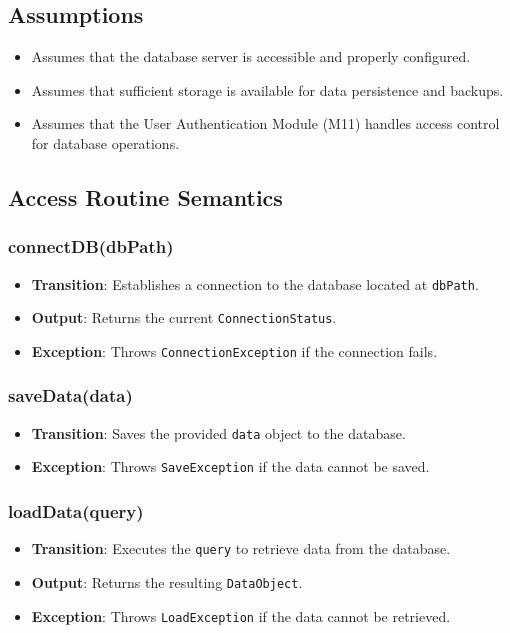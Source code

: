 \documentclass[12pt, titlepage]{article}
\begin{document}
\subsection{Assumptions}
\begin{itemize}
    \item Assumes that the database server is accessible and properly configured.
    \item Assumes that sufficient storage is available for data persistence and backups.
    \item Assumes that the User Authentication Module (M11) handles access control for database operations.
\end{itemize}

\subsection{Access Routine Semantics}

\subsubsection{connectDB(dbPath)}
\begin{itemize}
    \item \textbf{Transition}: Establishes a connection to the database located at \texttt{dbPath}.
    \item \textbf{Output}: Returns the current \texttt{ConnectionStatus}.
    \item \textbf{Exception}: Throws \texttt{ConnectionException} if the connection fails.
\end{itemize}

\subsubsection{saveData(data)}
\begin{itemize}
    \item \textbf{Transition}: Saves the provided \texttt{data} object to the database.
    \item \textbf{Exception}: Throws \texttt{SaveException} if the data cannot be saved.
\end{itemize}

\subsubsection{loadData(query)}
\begin{itemize}
    \item \textbf{Transition}: Executes the \texttt{query} to retrieve data from the database.
    \item \textbf{Output}: Returns the resulting \texttt{DataObject}.
    \item \textbf{Exception}: Throws \texttt{LoadException} if the data cannot be retrieved.
\end{itemize}
\end{document}
